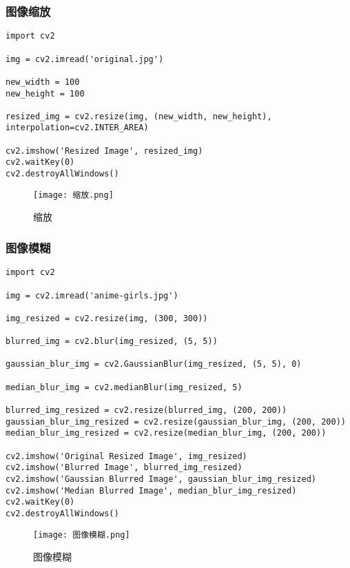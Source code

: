\documentclass{ctexart}
\begin{document}
\subsubsection{图像缩放}
\begin{lstlisting}
import cv2

img = cv2.imread('original.jpg')

new_width = 100
new_height = 100

resized_img = cv2.resize(img, (new_width, new_height), interpolation=cv2.INTER_AREA)

cv2.imshow('Resized Image', resized_img)
cv2.waitKey(0)
cv2.destroyAllWindows()

\end{lstlisting}

\begin{figure}[H]
    \centering
    \texttt{[image: 缩放.png]}
    \caption{缩放}
    \label{fig:enter-label}
\end{figure}
\subsubsection{图像模糊}

\begin{lstlisting}
import cv2

img = cv2.imread('anime-girls.jpg')

img_resized = cv2.resize(img, (300, 300))

blurred_img = cv2.blur(img_resized, (5, 5))

gaussian_blur_img = cv2.GaussianBlur(img_resized, (5, 5), 0)

median_blur_img = cv2.medianBlur(img_resized, 5)

blurred_img_resized = cv2.resize(blurred_img, (200, 200))
gaussian_blur_img_resized = cv2.resize(gaussian_blur_img, (200, 200))
median_blur_img_resized = cv2.resize(median_blur_img, (200, 200))

cv2.imshow('Original Resized Image', img_resized)
cv2.imshow('Blurred Image', blurred_img_resized)
cv2.imshow('Gaussian Blurred Image', gaussian_blur_img_resized)
cv2.imshow('Median Blurred Image', median_blur_img_resized)
cv2.waitKey(0)
cv2.destroyAllWindows()

\end{lstlisting}
\begin{figure}[H]
    \centering
    \texttt{[image: 图像模糊.png]}
    \caption{图像模糊}
    \label{fig:enter-label}
\end{figure}
\end{document}
